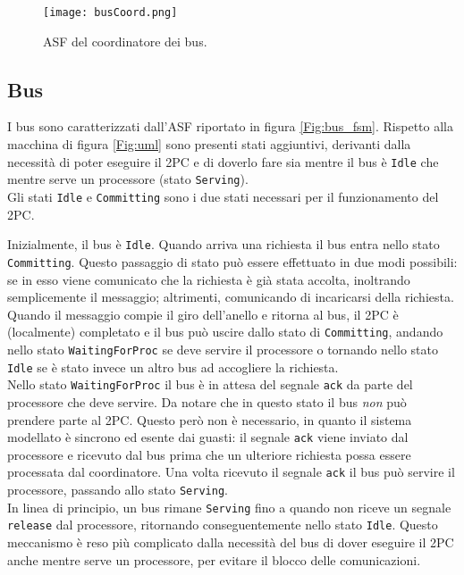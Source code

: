 \pagebreak

\begin{figure}
\vspace{-2cm}
\centerline{
	\texttt{[image: busCoord.png]}
}
\caption{ASF del coordinatore dei bus.}
\label{Fig:coord_fsm}
\end{figure}

\subsection{Bus} 
I bus sono caratterizzati dall'ASF riportato in figura \ref{Fig:bus_fsm}. Rispetto alla macchina di figura \ref{Fig:uml} sono presenti stati aggiuntivi, derivanti dalla necessità di poter eseguire il 2PC e di doverlo fare sia mentre il bus è \texttt{Idle} che mentre serve un processore (stato \texttt{Serving}). \\


Gli stati \texttt{Idle} e \texttt{Committing} sono i due stati necessari per il funzionamento del 2PC. 

Inizialmente, il bus è \texttt{Idle}. Quando arriva una richiesta il bus entra nello stato \texttt{Committing}. Questo passaggio di stato può essere effettuato in due modi possibili: se in esso viene comunicato che la richiesta è già stata accolta, inoltrando semplicemente il messaggio; altrimenti, comunicando di incaricarsi della richiesta. Quando il messaggio compie il giro dell'anello e ritorna al bus, il 2PC è (localmente) completato e il bus può uscire dallo stato di \texttt{Committing}, andando nello stato \texttt{WaitingForProc} se deve servire il processore o tornando nello stato \texttt{Idle} se è stato invece un altro bus ad accogliere la richiesta.\\


Nello stato \texttt{WaitingForProc} il bus è in attesa del segnale \texttt{ack} da parte del processore che deve servire. Da notare che in questo stato il bus \textit{non} può prendere parte al 2PC. Questo però non è necessario, in quanto il sistema modellato è sincrono ed esente dai guasti: il segnale \texttt{ack} viene inviato dal processore e ricevuto dal bus prima che un ulteriore richiesta possa essere processata dal coordinatore. Una volta ricevuto il segnale \texttt{ack} il bus può servire il processore, passando allo stato \texttt{Serving}.\\


In linea di principio, un bus rimane \texttt{Serving} fino a quando non riceve un segnale \texttt{release} dal processore, ritornando conseguentemente nello stato \texttt{Idle}. Questo meccanismo è reso più complicato dalla necessità del bus di dover eseguire il 2PC anche mentre serve un processore, per evitare il blocco delle comunicazioni.

